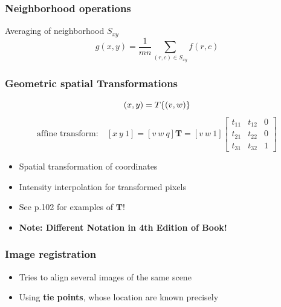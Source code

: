 \subsubsection{Neighborhood operations }
Averaging of neighborhood $S_{xy}$
\begin{equation}
g(x,y) = \frac{1}{mn} \sum_{(r,c)\in S_{xy}}f(r,c)
\end{equation}

\subsubsection{Geometric spatial Transformations }
\begin{minipage}{0.55\textwidth}
  \[
  (x,y) = T\{(v,w)\} \notag \\
  \]
  \[
  \text{affine transform:} \quad \left[ x~y~1 \right] = [ v~w~q ] \mathbf{T} = [ v~w~1 ]
  \left[ \begin{array}{ccc}
  t_{11} & t_{12} & 0 \\
  t_{21} & t_{22} & 0 \\
  t_{31} & t_{32} & 1 \end{array} \right]
  \]
\end{minipage}
\begin{minipage}{0.45\textwidth}
  \begin{itemize}
\item Spatial transformation of coordinates
\item Intensity interpolation for transformed pixels
\item See p.102 for examples of $\mathbf{T}$!
\item \textbf{Note: Different Notation in 4th Edition of Book!}
\end{itemize}
\end{minipage}

\subsubsection{Image registration }
\begin{itemize}
  \item Tries to align several images of the same scene
  \item Using \textbf{tie points}, whose location are known precisely
\end{itemize}
